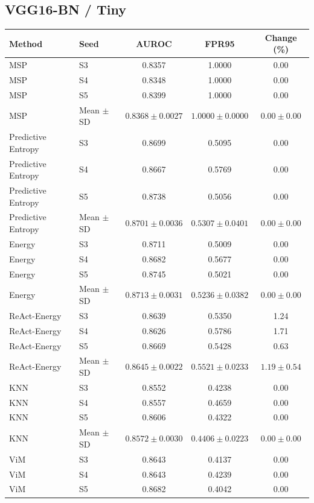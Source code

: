 \subsection*{VGG16-BN / Tiny}
\begingroup
\footnotesize
\setlength{\tabcolsep}{3pt}
\renewcommand{\arraystretch}{1.1}
\begin{longtable}{@{}llccc@{}}
\toprule
Method & Seed & AUROC & FPR95 & Change (\%) \\
\midrule
\endhead
\bottomrule
\endlastfoot
MSP & S3 & 0.8357 & 1.0000 & 0.00 \\
MSP & S4 & 0.8348 & 1.0000 & 0.00 \\
MSP & S5 & 0.8399 & 1.0000 & 0.00 \\
MSP & Mean $\pm$ SD & $0.8368 \pm 0.0027$ & $1.0000 \pm 0.0000$ & $0.00 \pm 0.00$ \\
Predictive Entropy & S3 & 0.8699 & 0.5095 & 0.00 \\
Predictive Entropy & S4 & 0.8667 & 0.5769 & 0.00 \\
Predictive Entropy & S5 & 0.8738 & 0.5056 & 0.00 \\
Predictive Entropy & Mean $\pm$ SD & $0.8701 \pm 0.0036$ & $0.5307 \pm 0.0401$ & $0.00 \pm 0.00$ \\
Energy & S3 & 0.8711 & 0.5009 & 0.00 \\
Energy & S4 & 0.8682 & 0.5677 & 0.00 \\
Energy & S5 & 0.8745 & 0.5021 & 0.00 \\
Energy & Mean $\pm$ SD & $0.8713 \pm 0.0031$ & $0.5236 \pm 0.0382$ & $0.00 \pm 0.00$ \\
ReAct-Energy & S3 & 0.8639 & 0.5350 & 1.24 \\
ReAct-Energy & S4 & 0.8626 & 0.5786 & 1.71 \\
ReAct-Energy & S5 & 0.8669 & 0.5428 & 0.63 \\
ReAct-Energy & Mean $\pm$ SD & $0.8645 \pm 0.0022$ & $0.5521 \pm 0.0233$ & $1.19 \pm 0.54$ \\
KNN & S3 & 0.8552 & 0.4238 & 0.00 \\
KNN & S4 & 0.8557 & 0.4659 & 0.00 \\
KNN & S5 & 0.8606 & 0.4322 & 0.00 \\
KNN & Mean $\pm$ SD & $0.8572 \pm 0.0030$ & $0.4406 \pm 0.0223$ & $0.00 \pm 0.00$ \\
ViM & S3 & 0.8643 & 0.4137 & 0.00 \\
ViM & S4 & 0.8643 & 0.4239 & 0.00 \\
ViM & S5 & 0.8682 & 0.4042 & 0.00 \\

\end{longtable}
